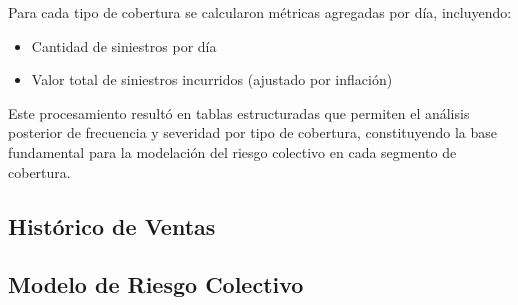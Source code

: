 Para cada tipo de cobertura se calcularon métricas agregadas por día, incluyendo:
\begin{itemize}
    \item Cantidad de siniestros por día
    \item Valor total de siniestros incurridos (ajustado por inflación)
\end{itemize}

Este procesamiento resultó en tablas estructuradas que permiten el análisis posterior de frecuencia y severidad por tipo de cobertura, constituyendo la base fundamental para la modelación del riesgo colectivo en cada segmento de cobertura.

\subsection{Histórico de Ventas}

\subsection{Modelo de Riesgo Colectivo} 